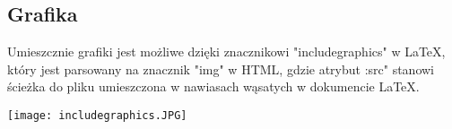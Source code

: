 \subsection{Grafika}

Umieszcznie grafiki jest możliwe dzięki znacznikowi "includegraphics" w LaTeX, który jest parsowany na znacznik "img" w HTML, gdzie 
atrybut :src" stanowi ścieżka do pliku umieszczona w nawiasach wąsatych w dokumencie LaTeX.

\texttt{[image: includegraphics.JPG]}
